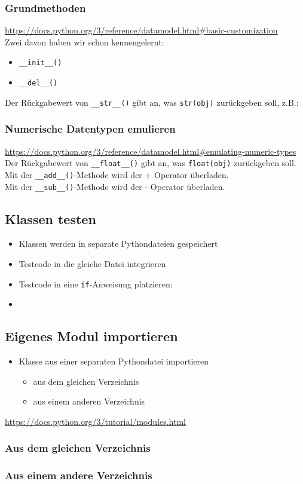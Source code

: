\subsubsection{Grundmethoden}
\url{https://docs.python.org/3/reference/datamodel.html#basic-customization}\\
Zwei davon haben wir schon kennengelernt:
\begin{itemize}
	\item \texttt{\_\_init\_\_()}
	\item \texttt{\_\_del\_\_()}
\end{itemize}
Der Rückgabewert von \texttt{\_\_str\_\_()} gibt an, was \texttt{str(obj)} zurückgeben soll, z.B.:


\subsubsection{Numerische Datentypen emulieren}
\url{https://docs.python.org/3/reference/datamodel.html#emulating-numeric-types}\\
Der Rückgabewert von \texttt{\_\_float\_\_()} gibt an, was \texttt{float(obj)} zurückgeben soll.\\
Mit der \texttt{\_\_add\_\_()}-Methode wird der + Operator überladen.\\
Mit der \texttt{\_\_sub\_\_()}-Methode wird der - Operator überladen.


\subsection{Klassen testen}
\begin{itemize}
	\item Klassen werden in separate Pythondateien gespeichert
	\item Testcode in die gleiche Datei integrieren
	\item Testcode in eine \texttt{if}-Anweisung platzieren:
	\item[\-] 
\end{itemize}



\subsection{Eigenes Modul importieren}
\begin{itemize}
	\item Klasse aus einer separaten Pythondatei importieren
	\begin{itemize}
		\item aus dem gleichen Verzeichnis
		\item aus einem anderen Verzeichnis
	\end{itemize}
\end{itemize}
\url{https://docs.python.org/3/tutorial/modules.html}\\

\subsubsection{Aus dem gleichen Verzeichnis}


\subsubsection{Aus einem andere Verzeichnis}

